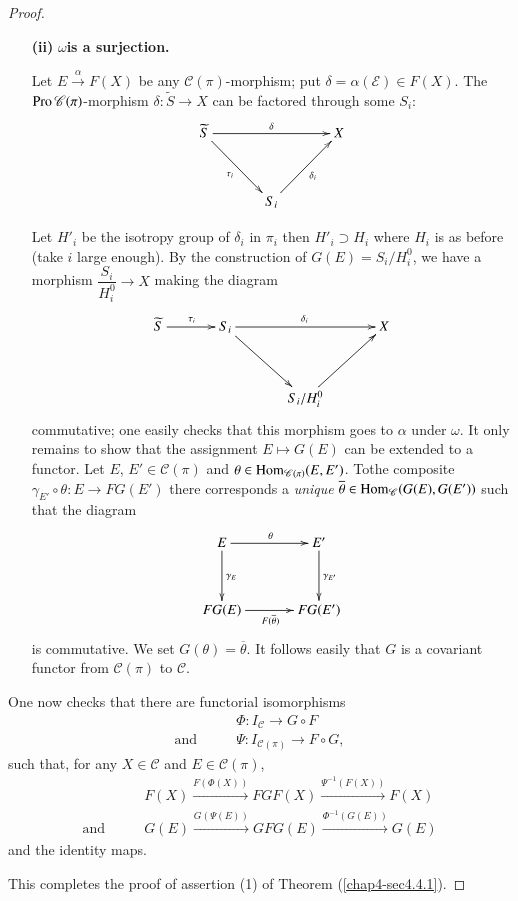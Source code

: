 \begin{proof}
\begin{itemize}
\item[{\bf(ii)}] {\bf {\boldmath$\omega$}\pageoriginale is a surjection.}

Let $E\xrightarrow{\alpha}F(X)$ be any $\mathscr{C}(\pi)$-morphism;
put $\delta=\alpha(\mathscr{E})\in F(X)$. The
$\operatorname{Pro}\mathscr{C}(\pi)$-morphism $\delta:\widetilde{S}\to X$ can be
factored through some $S_{i}$:
\[
\xymatrix@=1.2cm{
\widetilde{S}\ar[rr]^{\delta}\ar[dr]_{\tau_{i}} & & X\\
 & S_{i}\ar[ur]_{\delta_{i}} &
}
\]

Let $H'_{i}$ be the isotropy group of $\delta_{i}$ in $\pi_{i}$ then
$H'_{i}\supset H_{i}$ where $H_{i}$ is as before (take $i$ large
enough). By the construction of $G(E)=S_{i}/H^{0}_{i}$, we have a
morphism $\dfrac{S_{i}}{H^{0}_{i}}\to X$ making the diagram
\[
\xymatrix@=1.2cm{
\widetilde{S}\ar[r]^{\tau_{i}} & S_{i}\ar[rr]^{\delta_{i}}\ar[dr] &&
X\\
 & & S_{i}/H^{0}_{i}\ar[ur] &
}
\]
commutative; one easily checks that this morphism goes to $\alpha$
under $\omega$. It only remains to show that the assignment $E\mapsto
G(E)$ can be extended to a functor. Let $E$, $E'\in\mathscr{C}(\pi)$ and
$\theta\in \Hom_{\mathscr{C}(\pi)}\break (E,E')$. To\pageoriginale the
composite $\gamma_{E'}\circ \theta:E\to FG(E')$ there corresponds a
{\em unique} $\overline{\theta}\in \operatorname{Hom}_{\mathscr{C}}(G(E),G(E'))$
such that the diagram
\[
\xymatrix@=1.2cm{
E\ar[r]^{\theta}\ar[d]^{\gamma_{E}} & E'\ar[d]^{\gamma_{E'}}\\
FG(E)\ar[r]_{F(\overline{\theta})} & FG(E')
}
\]
is commutative. We set $G(\theta)=\overline{\theta}$. It follows
easily that $G$ is a covariant functor from $\mathscr{C}(\pi)$ to
$\mathscr{C}$. 
\end{itemize}

One now checks that there are functorial isomorphisms
\begin{align*}
&\Phi: I_{\mathscr{C}}\to G\circ F\\
\text{and}\qquad & \Psi: I_{\mathscr{C(\pi)}}\to F\circ G,
\end{align*}
such that, for any $X\in \mathscr{C}$ and $E\in\mathscr{C}(\pi)$,
\begin{align*}
& F(X)\xrightarrow{F(\Phi(X))}FGF(X)\xrightarrow{\Psi^{-1}(F(X))}F(X)\\
\text{and}\qquad
& G(E)\xrightarrow{G(\Psi(E))}GFG(E)\xrightarrow{\Phi^{-1}(G(E))}G(E)
\end{align*}
and the identity maps.

This completes the proof of assertion (1) of Theorem (\ref{chap4-sec4.4.1}).
\end{proof}


